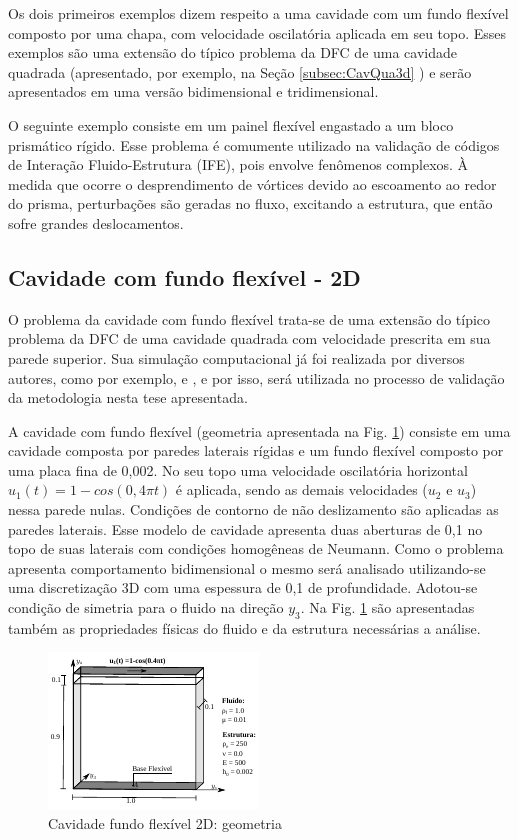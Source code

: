 \documentclass[tese_patricia]{subfiles}
\begin{document}
Os dois primeiros exemplos dizem respeito a uma cavidade com um fundo flexível composto por uma chapa, com velocidade oscilatória aplicada em seu topo. Esses exemplos são uma extensão do típico problema da DFC de uma cavidade quadrada (apresentado, por exemplo, na Seção \ref{subsec:CavQua3d} ) e serão apresentados em uma versão bidimensional e tridimensional.

O seguinte exemplo consiste em um painel flexível engastado a um bloco prismático rígido. Esse problema é comumente utilizado na validação de códigos de Interação Fluido-Estrutura (IFE), pois envolve fenômenos complexos. À medida que ocorre o desprendimento de vórtices devido ao escoamento ao redor do prisma, perturbações são geradas no fluxo, excitando a estrutura, que então sofre grandes deslocamentos.

\subsection{Cavidade com fundo flexível - 2D}

O problema da cavidade com fundo flexível trata-se de uma extensão do típico problema da DFC de uma cavidade quadrada com velocidade prescrita em sua parede superior. Sua simulação computacional já foi realizada por diversos autores, como por exemplo,  e , e  por isso, será utilizada no processo de validação da metodologia nesta tese apresentada.

A cavidade com fundo flexível (geometria apresentada na Fig. \ref{fig:cavidadeFF2d:Geo}) consiste em uma cavidade composta por paredes laterais rígidas e um fundo flexível composto por uma placa fina de 0,002. No seu topo uma velocidade oscilatória horizontal $u_1(t)=1-cos(0,4 \pi t)$ é aplicada, sendo as demais velocidades ($u_2$ e $u_3$) nessa parede nulas. Condições de contorno de não deslizamento são aplicadas as paredes laterais. Esse modelo de cavidade apresenta duas aberturas de 0,1 no topo de suas laterais com condições homogêneas de Neumann. Como o problema apresenta comportamento bidimensional o mesmo será analisado utilizando-se uma discretização 3D com uma espessura de 0,1 de profundidade. Adotou-se condição de simetria para o fluido na direção $y_3$.  Na Fig. \ref{fig:cavidadeFF2d:Geo} são apresentadas também as propriedades físicas do fluido e da estrutura necessárias a análise.

\begin{figure}[htb!]
	\centering 
	\includegraphics[scale=2.0,trim=0cm 0cm 0cm 0cm, clip=true]{Imagens/Cap7/cav2d.pdf}	
	\caption{Cavidade fundo flexível 2D: geometria}
	\label{fig:cavidadeFF2d:Geo}
\end{figure}
\end{document}
